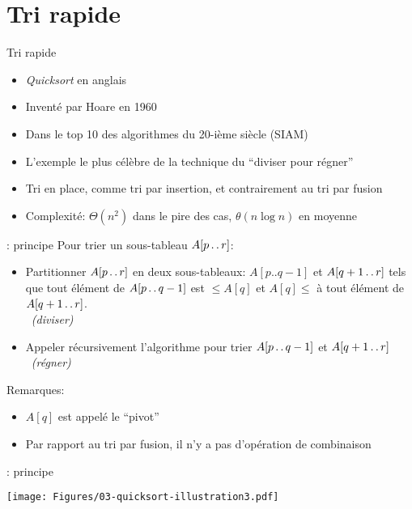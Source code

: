 \section{Tri rapide}

\begin{frame}{Tri rapide}
\begin{itemize}
\item {\em Quicksort} en anglais
\item Inventé par Hoare en 1960
\item Dans le top 10 des algorithmes du 20-ième siècle (SIAM)
\item L'exemple le plus célèbre de la technique du ``diviser pour régner''
\item Tri en place, comme tri par insertion, et contrairement au tri par fusion
\item Complexité: $\Theta(n^2)$ dans le pire des cas, $\theta(n\log n)$ en moyenne
\end{itemize}
\end{frame}

\begin{frame}{: principe}
Pour trier un sous-tableau $A[p\mathinner{\ldotp\ldotp} r]$:
\begin{itemize}
\item Partitionner $A[p\mathinner{\ldotp\ldotp} r]$ en deux sous-tableaux: $A[p..q-1]$ et $A[q+1\mathinner{\ldotp\ldotp} r]$ tels que tout élément de $A[p\mathinner{\ldotp\ldotp} q-1]$ est $\leq A[q]$ et $A[q]\leq$ à tout élément de $A[q+1\mathinner{\ldotp\ldotp} r]$.\\~\hfill\alert{\emph{(diviser)}}

\item Appeler récursivement l'algorithme pour trier $A[p\mathinner{\ldotp\ldotp} q-1]$ et $A[q+1\mathinner{\ldotp\ldotp} r]$\\~\hfill\alert{\emph{(régner)}}
\end{itemize}

\bigskip

Remarques:
\begin{itemize}
\item $A[q]$ est appelé le ``\alert{pivot}''
\item Par rapport au tri par fusion, il n'y a pas d'opération de combinaison
\end{itemize}

\end{frame}

\begin{frame}{: principe}

\centerline{\texttt{[image: Figures/03-quicksort-illustration3.pdf]}}


\end{frame}

